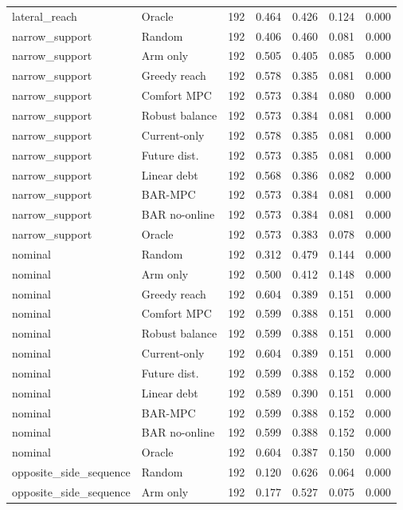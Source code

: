 \begin{longtable}{llrrrrr}
lateral\_reach & Oracle & 192 & 0.464 & 0.426 & 0.124 & 0.000 \\
narrow\_support & Random & 192 & 0.406 & 0.460 & 0.081 & 0.000 \\
narrow\_support & Arm only & 192 & 0.505 & 0.405 & 0.085 & 0.000 \\
narrow\_support & Greedy reach & 192 & 0.578 & 0.385 & 0.081 & 0.000 \\
narrow\_support & Comfort MPC & 192 & 0.573 & 0.384 & 0.080 & 0.000 \\
narrow\_support & Robust balance & 192 & 0.573 & 0.384 & 0.081 & 0.000 \\
narrow\_support & Current-only & 192 & 0.578 & 0.385 & 0.081 & 0.000 \\
narrow\_support & Future dist. & 192 & 0.573 & 0.385 & 0.081 & 0.000 \\
narrow\_support & Linear debt & 192 & 0.568 & 0.386 & 0.082 & 0.000 \\
narrow\_support & BAR-MPC & 192 & 0.573 & 0.384 & 0.081 & 0.000 \\
narrow\_support & BAR no-online & 192 & 0.573 & 0.384 & 0.081 & 0.000 \\
narrow\_support & Oracle & 192 & 0.573 & 0.383 & 0.078 & 0.000 \\
nominal & Random & 192 & 0.312 & 0.479 & 0.144 & 0.000 \\
nominal & Arm only & 192 & 0.500 & 0.412 & 0.148 & 0.000 \\
nominal & Greedy reach & 192 & 0.604 & 0.389 & 0.151 & 0.000 \\
nominal & Comfort MPC & 192 & 0.599 & 0.388 & 0.151 & 0.000 \\
nominal & Robust balance & 192 & 0.599 & 0.388 & 0.151 & 0.000 \\
nominal & Current-only & 192 & 0.604 & 0.389 & 0.151 & 0.000 \\
nominal & Future dist. & 192 & 0.599 & 0.388 & 0.152 & 0.000 \\
nominal & Linear debt & 192 & 0.589 & 0.390 & 0.151 & 0.000 \\
nominal & BAR-MPC & 192 & 0.599 & 0.388 & 0.152 & 0.000 \\
nominal & BAR no-online & 192 & 0.599 & 0.388 & 0.152 & 0.000 \\
nominal & Oracle & 192 & 0.604 & 0.387 & 0.150 & 0.000 \\
opposite\_side\_sequence & Random & 192 & 0.120 & 0.626 & 0.064 & 0.000 \\
opposite\_side\_sequence & Arm only & 192 & 0.177 & 0.527 & 0.075 & 0.000 \\

\end{longtable}
